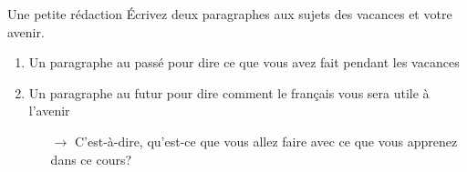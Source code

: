\begin{frame}{Une petite rédaction}
  Écrivez deux paragraphes aux sujets des vacances et votre avenir.
  \begin{enumerate}
    \item Un paragraphe \alert{au passé} pour dire ce que vous avez fait pendant les vacances
    \item Un paragraphe \alert{au futur} pour dire comment le français vous sera utile à l'avenir
    \begin{itemize}
      \item[$\to$] C'est-à-dire, qu'est-ce que vous allez faire avec ce que vous apprenez dans ce cours?
    \end{itemize}
  \end{enumerate}
\end{frame}
